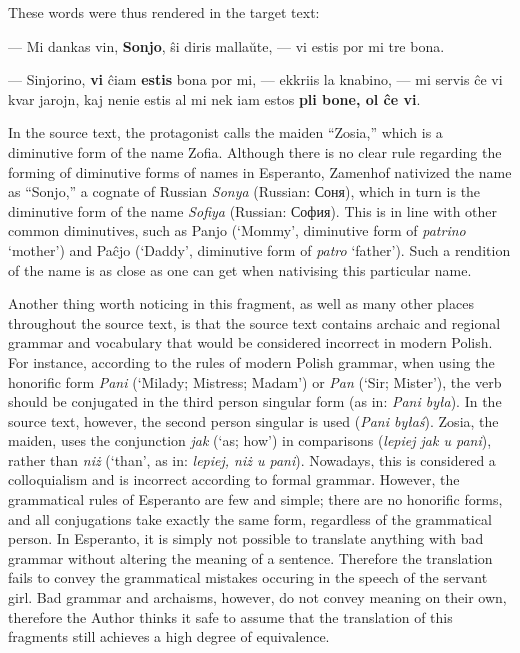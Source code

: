 These words were thus rendered in the target text:

\begin{displayquote}
--- Mi dankas vin, \textbf{Sonjo}, ŝi diris mallaŭte, --- vi estis por mi tre bona.

--- Sinjorino, \textbf{vi} ĉiam \textbf{estis} bona por mi, --- ekkriis la knabino, --- mi servis ĉe vi kvar jarojn, kaj nenie estis al mi nek iam estos \textbf{pli bone, ol ĉe vi}.
\end{displayquote}

In the source text, the protagonist calls the maiden ``Zosia,'' which is a diminutive form of the name Zofia.
Although there is no clear rule regarding the forming of diminutive forms of names in Esperanto, Zamenhof nativized the name as ``Sonjo,'' a cognate of Russian \textit{Sonya} (Russian: Соня), which in turn is the diminutive form of the name \textit{Sofiya} (Russian: София).
This is in line with other common diminutives, such as Panjo (`Mommy', diminutive form of \textit{patrino} `mother') and Pa\^cjo (`Daddy', diminutive form of \textit{patro} `father').
Such a rendition of the name is as close as one can get when nativising this particular name.



Another thing worth noticing in this fragment, as well as many other places throughout the source text, is that the source text contains archaic and regional grammar and vocabulary that would be considered incorrect in modern Polish. %
For instance, according to the rules of modern Polish grammar, when using the honorific form \textit{Pani} (`Milady; Mistress; Madam') or \textit{Pan} (`Sir; Mister'), the verb should be conjugated in the third person singular form (as in: \textit{Pani była}).
In the source text, however, the second person singular is used (\textit{Pani byłaś}).
Zosia, the maiden, uses the conjunction %
\textit{jak} (`as; how') in comparisons (\textit{lepiej jak u pani}), rather than \textit{niż} (`than', as in: \textit{lepiej, niż u pani}).
Nowadays, this is considered a colloquialism and is incorrect according to formal grammar. %
However, the grammatical rules of Esperanto are few and simple; there are no honorific forms, and all conjugations take exactly the same form, regardless of the grammatical person.
In Esperanto, it is simply not possible to translate anything with bad grammar without altering the meaning of a sentence.
Therefore the translation fails to convey the grammatical mistakes occuring in the speech of the servant girl.
Bad grammar and archaisms, however, do not convey meaning on their own, therefore the Author thinks it safe to assume that the translation of this fragments still achieves a high degree of equivalence.

